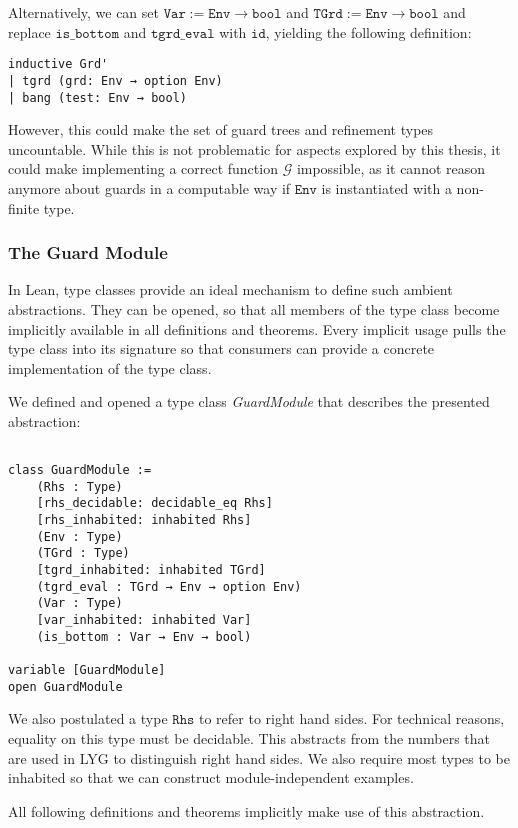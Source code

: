 Alternatively,
we can set $\mathtt{Var} := \mathtt{Env} → \mathtt{bool}$ and $\mathtt{TGrd} := \mathtt{Env} → \mathtt{bool}$ and replace $\mathtt{is\_bottom}$ and $\mathtt{tgrd\_eval}$ with $\mathtt{id}$,
yielding the following definition:
\begin{verbatim}
inductive Grd'
| tgrd (grd: Env → option Env)
| bang (test: Env → bool)
\end{verbatim}
However, this could make the set of guard trees and refinement types uncountable.
While this is not problematic for aspects explored by this thesis,
it could make implementing a correct function $\mathcal{G}$ impossible, as it cannot reason anymore about guards in a computable way if $\mathtt{Env}$ is instantiated with a non-finite type.

\bigskip

\subsubsection{The Guard Module}

In Lean, type classes provide an ideal mechanism to define such ambient abstractions.
They can be opened, so that all members of the type class become implicitly available in all definitions and theorems.
Every implicit usage pulls the type class into its signature so that consumers can provide a concrete implementation of the type class.

We defined and opened a type class \textit{GuardModule} that describes the presented abstraction:

\begin{verbatim}

class GuardModule :=
    (Rhs : Type)
    [rhs_decidable: decidable_eq Rhs]
    [rhs_inhabited: inhabited Rhs]
    (Env : Type)
    (TGrd : Type)
    [tgrd_inhabited: inhabited TGrd]
    (tgrd_eval : TGrd → Env → option Env)
    (Var : Type)
    [var_inhabited: inhabited Var]
    (is_bottom : Var → Env → bool)

variable [GuardModule]
open GuardModule
\end{verbatim}

We also postulated a type $\mathtt{Rhs}$ to refer to right hand sides. For technical reasons, equality on this type must be decidable.
This abstracts from the numbers that are used in LYG to distinguish right hand sides.
We also require most types to be inhabited so that we can construct module-independent examples.

All following definitions and theorems implicitly make use of this abstraction.

